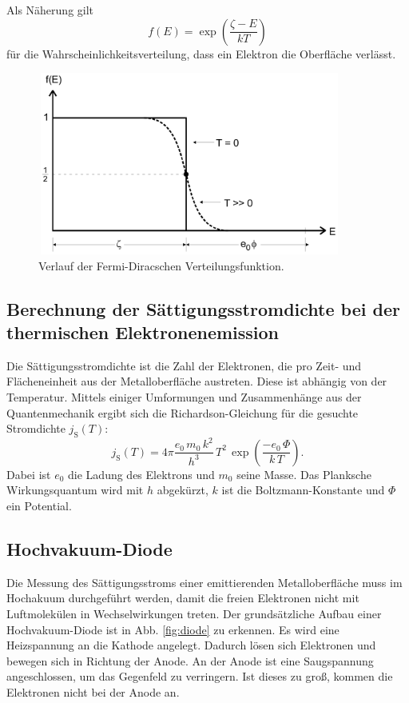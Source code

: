 \noindent Als Näherung gilt 
\begin{equation}
    f(E) = \exp(\frac{\zeta - E}{k T})
    \label{eqn:fermidirac}
\end{equation}
für die Wahrscheinlichkeitsverteilung, dass ein Elektron die 
Oberfläche  verlässt. 

\begin{figure}
    \centering
    \includegraphics[width=10cm, height=6cm]{build/fermidirac.png}
    \caption{Verlauf der Fermi-Diracschen Verteilungsfunktion. \cite{V504}}
    \label{fig:Fermidirac}
\end{figure}

\subsection{Berechnung der Sättigungsstromdichte bei der 
thermischen Elektronenemission}

Die Sättigungsstromdichte ist die Zahl der 
Elektronen, die pro Zeit- und Flächeneinheit aus der 
Metalloberfläche austreten. Diese ist abhängig von der 
Temperatur. Mittels einiger Umformungen und 
Zusammenhänge aus der Quantenmechanik ergibt sich die 
Richardson-Gleichung für die gesuchte Stromdichte $j_\text{S}(T)$:
\begin{equation}
    j_\text{S}(T)= 4 \pi \frac{e_0 \, m_0 \, k^2}{h^3} \, T^2 \, \exp(\frac{-e_0 \, \Phi}{k \, T}).
    \label{eqn:richardson}
\end{equation} 
Dabei ist $e_0$ die Ladung des Elektrons und $m_0$ seine Masse. 
Das Planksche Wirkungsquantum wird mit $h$ abgekürzt, $k$ ist 
die Boltzmann-Konstante und $\Phi$ ein Potential. %

\subsection{Hochvakuum-Diode}

Die Messung des Sättigungsstroms einer emittierenden 
Metalloberfläche muss im Hochakuum durchgeführt werden, 
damit die freien Elektronen nicht mit Luftmolekülen in 
Wechselwirkungen treten. Der grundsätzliche Aufbau einer 
Hochvakuum-Diode ist in Abb. \ref{fig:diode} zu erkennen.
Es wird eine Heizspannung an die Kathode angelegt. Dadurch 
lösen sich Elektronen und bewegen sich in Richtung der Anode. 
An der Anode ist eine Saugspannung angeschlossen, um das 
Gegenfeld zu verringern. Ist dieses zu groß, kommen die 
Elektronen nicht bei der Anode an. 

